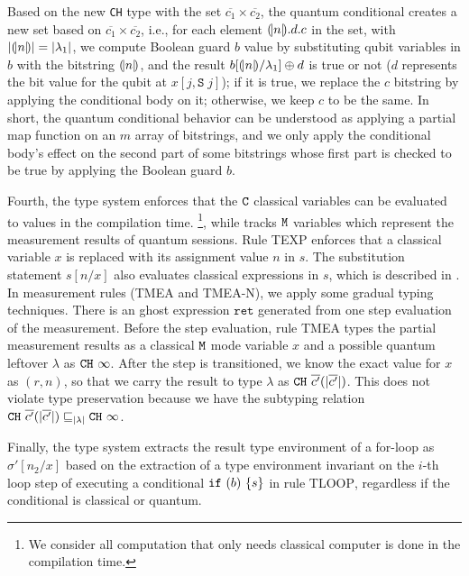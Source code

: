 Based on the new \texttt{CH} type with the set $\overline{c_1}\times \overline{c_2}$,
the quantum conditional creates a new set based on $\overline{c_1}\times \overline{c_2}$, i.e., for each element $(\!| n |\!).d.c$ in the set, with $|(\!| n |\!)|=|\lambda_1|$, we compute Boolean guard $b$ value by substituting qubit variables in $b$ with the bitstring $(\!| n |\!)$, and the result $b[(\!| n |\!) / \lambda_1] \oplus d$ is true or not ($d$ represents the bit value for the qubit at $x[j,\texttt{S}\;j]$); if it is true, we replace the $c$ bitstring by applying the conditional body on it; otherwise, we keep $c$ to be the same.
In short, the quantum conditional behavior can be understood as applying a partial map function on an $m$ array of bitstrings, and we only apply the conditional body's effect on the second part of some bitstrings whose first part is checked to be true by applying the Boolean guard $b$.

Fourth, the type system enforces that the $\texttt{C}$ classical variables can be evaluated to values in the compilation time. \footnote{We consider all computation that only needs classical computer is done in the compilation time.}, while tracks $\texttt{M}$ variables which represent the measurement results of quantum sessions. Rule \textsc{TEXP} enforces that a classical variable $x$ is replaced with its assignment value $n$ in $s$. The substitution statement $s[n/x]$ also evaluates classical expressions in $s$, which is described in .
In measurement rules (\textsc{TMEA} and \textsc{TMEA-N}), we apply some gradual typing techniques.
There is an ghost expression $\texttt{ret}$ generated from one step evaluation of the measurement.
Before the step evaluation, rule \textsc{TMEA} types the partial measurement results as a classical $\texttt{M}$ mode variable $x$ and a possible quantum leftover $\lambda$ as $\texttt{CH}~{\infty}$.
After the step is transitioned, we know the exact value for $x$ as $(r,n)$, so that we carry the result to type $\lambda$ as $\texttt{CH}~{\overline{c'}(|\overline{c'}|)}$. This does not violate type preservation because we have the subtyping relation $\texttt{CH}~{\overline{c'}(|\overline{c'}|)} \sqsubseteq_{|\lambda|} \texttt{CH}~{\infty}$.

Finally, the type system extracts the result type environment of a for-loop as $\sigma'[n_2/x]$ based on the extraction of a type environment invariant on the $i$-th loop step of executing a conditional $\texttt{if}~{(b)}~{\{s\}}$ in rule \textsc{TLOOP}, regardless if the conditional is classical or quantum. 


